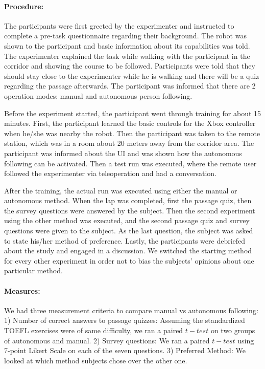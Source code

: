 \paragraph{Procedure:}

The participants were first greeted by the experimenter and instructed to complete a pre-task questionnaire regarding their background. The robot was shown to the participant and basic information about its capabilities was told. The experimenter explained the task while walking with the participant in the corridor and showing the course to be followed. Participants were told that they should stay close to the experimenter while he is walking and there will be a quiz regarding the passage afterwards. The participant was informed that there are 2 operation modes: manual and autonomous person following.

Before the experiment started, the participant went through training for about 15 minutes. First, the participant learned the basic controls for the Xbox controller when he/she was nearby the robot. Then the participant was taken to the remote station, which was in a room about 20 meters away from the corridor area. The participant was informed about the UI and was shown how the autonomous following can be activated. Then a test run was executed, where the remote user followed the experimenter via teleoperation and had a conversation.

After the training, the actual run was executed using either the manual or autonomous method. When the lap was completed, first the passage quiz, then the survey questions were answered by the subject. Then the second experiment using the other method was executed, and the second passage quiz and survey questions were given to the subject. As the last question, the subject was asked to state his/her method of preference. Lastly, the participants were debriefed about the study and engaged in a discussion. We switched the starting method for every other experiment in order not to bias the subjects' opinions about one particular method.

\paragraph{Measures:}
We had three measurement criteria to compare manual vs autonomous following: 1) Number of correct answers to passage quizzes: Assuming the standardized TOEFL exercises were of same difficulty, we ran a paired $t-test$ on two groups of autonomous and manual. 2) Survey questions: We ran a paired $t-test$ using 7-point Likert Scale on each of the seven questions. 3) Preferred Method: We looked at which method subjects chose over the other one.

